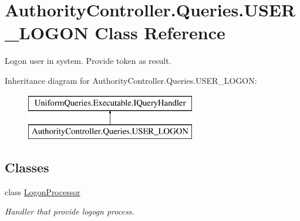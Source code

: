 \hypertarget{class_authority_controller_1_1_queries_1_1_u_s_e_r___l_o_g_o_n}{}\section{Authority\+Controller.\+Queries.\+U\+S\+E\+R\+\_\+\+L\+O\+G\+ON Class Reference}
\label{class_authority_controller_1_1_queries_1_1_u_s_e_r___l_o_g_o_n}


Logon user in system. Provide token as result.  


Inheritance diagram for Authority\+Controller.\+Queries.\+U\+S\+E\+R\+\_\+\+L\+O\+G\+ON\+:\begin{figure}[H]
\begin{center}
\leavevmode
\includegraphics[height=2.000000cm]{de/d4c/class_authority_controller_1_1_queries_1_1_u_s_e_r___l_o_g_o_n}
\end{center}
\end{figure}
\subsection*{Classes}
\begin{DoxyCompactItemize}
\item 
class \mbox{\hyperlink{class_authority_controller_1_1_queries_1_1_u_s_e_r___l_o_g_o_n_1_1_logon_processor}{Logon\+Processor}}
\begin{DoxyCompactList}\small\item\em Handler that provide logogn process. \end{DoxyCompactList}\end{DoxyCompactItemize}
